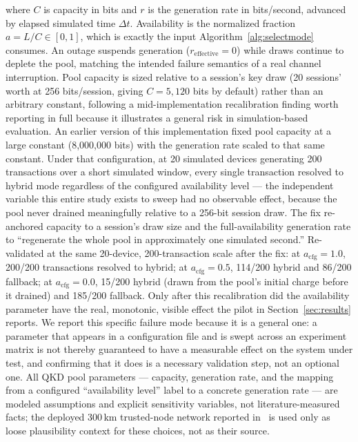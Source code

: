 \documentclass[journal]{IEEEtran}
\newcommand{\qkdavail}{\ensuremath{a}}
\newcommand{\acfg}{\ensuremath{a_{\text{cfg}}}}
\begin{document}
where $C$ is capacity in bits and $r$ is the generation rate in bits/second, advanced by elapsed simulated time $\Delta t$. Availability is the normalized fraction $\qkdavail = L / C \in [0,1]$, which is exactly the input Algorithm~\ref{alg:selectmode} consumes. An outage suspends generation ($r_{\text{effective}} = 0$) while draws continue to deplete the pool, matching the intended failure semantics of a real channel interruption. Pool capacity is sized relative to a session's key draw (20 sessions' worth at 256 bits/session, giving $C = 5{,}120$ bits by default) rather than an arbitrary constant, following a mid-implementation recalibration finding worth reporting in full because it illustrates a general risk in simulation-based evaluation. An earlier version of this implementation fixed pool capacity at a large constant (8{,}000{,}000 bits) with the generation rate scaled to that same constant. Under that configuration, at 20 simulated devices generating 200 transactions over a short simulated window, every single transaction resolved to hybrid mode regardless of the configured availability level --- the independent variable this entire study exists to sweep had no observable effect, because the pool never drained meaningfully relative to a 256-bit session draw. The fix re-anchored capacity to a session's draw size and the full-availability generation rate to ``regenerate the whole pool in approximately one simulated second.'' Re-validated at the same 20-device, 200-transaction scale after the fix: at $\acfg=1.0$, 200/200 transactions resolved to hybrid; at $\acfg=0.5$, 114/200 hybrid and 86/200 fallback; at $\acfg=0.0$, 15/200 hybrid (drawn from the pool's initial charge before it drained) and 185/200 fallback. Only after this recalibration did the availability parameter have the real, monotonic, visible effect the pilot in Section~\ref{sec:results} reports. We report this specific failure mode because it is a general one: a parameter that appears in a configuration file and is swept across an experiment matrix is not thereby guaranteed to have a measurable effect on the system under test, and confirming that it does is a necessary validation step, not an optional one. All QKD pool parameters --- capacity, generation rate, and the mapping from a configured ``availability level'' label to a concrete generation rate --- are modeled assumptions and explicit sensitivity variables, not literature-measured facts; the deployed 300\,km trusted-node network reported in~\cite{clason2026deployed} is used only as loose plausibility context for these choices, not as their source.
\end{document}

